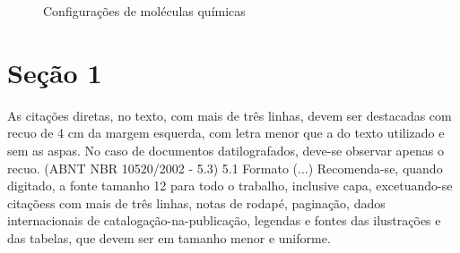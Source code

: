\documentclass[12pt,oneside,a4paper]{abntex2}
\begin{document}
\lipsum[5]


\begin{figure}[htb]
	\caption{\label{fig_aromaticos}Configurações de moléculas químicas}


	\begin{center}
		\makevisible
		\begin{rxn}
		\end{rxn}
	
	\end{center}
	
	
\end{figure}

\lipsum[6]


\section{Seção 1}

\lipsum[7]

\begin{citacao}
As citações diretas, no texto, com mais de três linhas, devem ser
destacadas com recuo de 4 cm da margem esquerda, com letra menor que a do texto
utilizado e sem as aspas. No caso de documentos datilografados, deve-se
observar apenas o recuo. (ABNT NBR 10520/2002 - 5.3) 5.1 Formato
(...)
Recomenda-se, quando digitado, a fonte tamanho 12 para todo o trabalho,
inclusive capa, excetuando-se citaçõess com mais de três linhas, notas de
rodapé, paginação, dados internacionais de catalogação-na-publicação,
legendas e fontes das ilustrações e das tabelas, que devem ser em tamanho menor
e uniforme.
\end{citacao}
\end{document}
